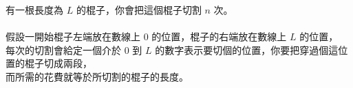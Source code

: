 有一根長度為 $L$ 的棍子，你會把這個棍子切割 $n$ 次。\\
\\
假設一開始棍子左端放在數線上 $0$ 的位置，棍子的右端放在數線上 $L$ 的位置，\\
每次的切割會給定一個介於 $0$ 到 $L$ 的數字表示要切個的位置，你要把穿過個這位置的棍子切成兩段，\\
而所需的花費就等於所切割的棍子的長度。\\
